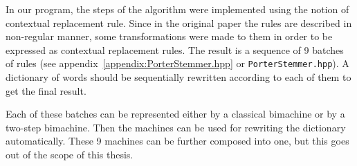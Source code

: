 \documentclass{article}
\begin{document}
	In our program, the steps of the algorithm were implemented using the notion of contextual replacement rule.
	Since in the original paper the rules are described in non-regular manner, some transformations were made to them in order to be expressed as contextual replacement rules. The result is a sequence of 9 batches of rules (see appendix~\ref{appendix:PorterStemmer.hpp} or \texttt{PorterStemmer.hpp}).
	A dictionary of words should be sequentially rewritten according to each of them to get the final result.
	
	Each of these batches can be represented either by a classical bimachine or by a two-step bimachine. Then the machines can be used for rewriting the dictionary automatically. These 9 machines can be further composed into one, but this goes out of the scope of this thesis.
\end{document}
